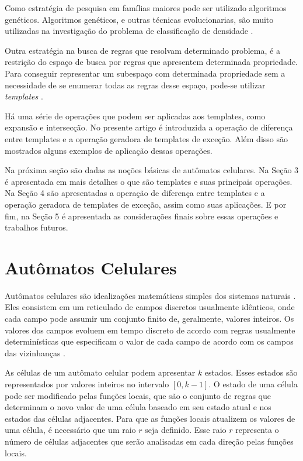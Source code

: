 \documentclass[12pt, a4paper]{article}
\begin{document}
Como estratégia de pesquisa em famílias maiores pode ser utilizado algoritmos genéticos. Algoritmos genéticos, e outras técnicas evolucionarias, são muito utilizadas na investigação do problema de classificação de densidade \cite{wolz2008very}.


Outra estratégia na busca de regras que resolvam determinado problema, é a restrição do espaço de busca por regras que apresentem determinada propriedade. Para conseguir representar um subespaço com determinada propriedade sem a necessidade de se enumerar todas as regras desse espaço, pode-se utilizar \textit{templates} \cite{deOliveira2014}.

Há uma série de operações que podem ser aplicadas aos templates, como expansão e intersecção. No presente artigo é introduzida a operação de diferença entre templates e a operação geradora de templates de exceção. Além disso são mostrados alguns exemplos de aplicação dessas operações.

Na próxima seção são dadas as noções básicas de autômatos celulares. Na Seção 3 é apresentada em mais detalhes o que são templates e suas principais operações. Na Seção 4 são apresentadas a operação de diferença entre templates e a operação geradora de templates de exceção, assim como suas aplicações. E por fim, na Seção 5 é apresentada as considerações finais sobre essas operações e trabalhos futuros.

\section{Autômatos Celulares}
\label{sec:automatos_celulares}
Autômatos celulares são idealizações matemáticas simples dos sistemas naturais \cite{wolfram1994cellular}. Eles consistem em um reticulado de campos discretos usualmente idênticos, onde cada campo pode assumir um conjunto finito de, geralmente, valores inteiros. Os valores dos campos evoluem em tempo discreto de acordo com regras usualmente determinísticas que especificam o valor de cada campo de acordo com os campos das vizinhanças \cite{wolfram1994cellular}.

As células de um autômato celular podem apresentar $k$ estados. Esses estados são representados por valores inteiros no intervalo $[0, k-1]$. O estado de uma célula pode ser modificado pelas funções locais, que são o conjunto de regras que determinam o novo valor de uma célula baseado em seu estado atual e nos estados das células adjacentes. Para que as funções locais atualizem os valores de uma célula, é necessário que um raio $r$ seja definido. Esse raio $r$ representa o número de células adjacentes que serão analisadas em cada direção pelas funções locais.
\end{document}
